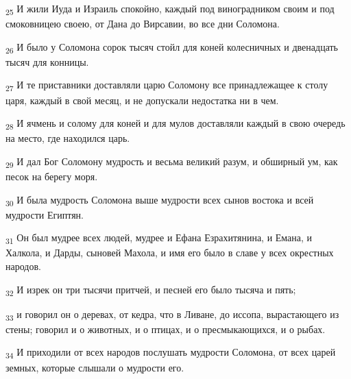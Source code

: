 \begin{tcolorbox}
\textsubscript{25} И жили Иуда и Израиль спокойно, каждый под виноградником своим и под смоковницею своею, от Дана до Вирсавии, во все дни Соломона.
\end{tcolorbox}
\begin{tcolorbox}
\textsubscript{26} И было у Соломона сорок тысяч стойл для коней колесничных и двенадцать тысяч для конницы.
\end{tcolorbox}
\begin{tcolorbox}
\textsubscript{27} И те приставники доставляли царю Соломону все принадлежащее к столу царя, каждый в свой месяц, и не допускали недостатка ни в чем.
\end{tcolorbox}
\begin{tcolorbox}
\textsubscript{28} И ячмень и солому для коней и для мулов доставляли каждый в свою очередь на место, где находился царь.
\end{tcolorbox}
\begin{tcolorbox}
\textsubscript{29} И дал Бог Соломону мудрость и весьма великий разум, и обширный ум, как песок на берегу моря.
\end{tcolorbox}
\begin{tcolorbox}
\textsubscript{30} И была мудрость Соломона выше мудрости всех сынов востока и всей мудрости Египтян.
\end{tcolorbox}
\begin{tcolorbox}
\textsubscript{31} Он был мудрее всех людей, мудрее и Ефана Езрахитянина, и Емана, и Халкола, и Дарды, сыновей Махола, и имя его было в славе у всех окрестных народов.
\end{tcolorbox}
\begin{tcolorbox}
\textsubscript{32} И изрек он три тысячи притчей, и песней его было тысяча и пять;
\end{tcolorbox}
\begin{tcolorbox}
\textsubscript{33} и говорил он о деревах, от кедра, что в Ливане, до иссопа, вырастающего из стены; говорил и о животных, и о птицах, и о пресмыкающихся, и о рыбах.
\end{tcolorbox}
\begin{tcolorbox}
\textsubscript{34} И приходили от всех народов послушать мудрости Соломона, от всех царей земных, которые слышали о мудрости его.
\end{tcolorbox}
